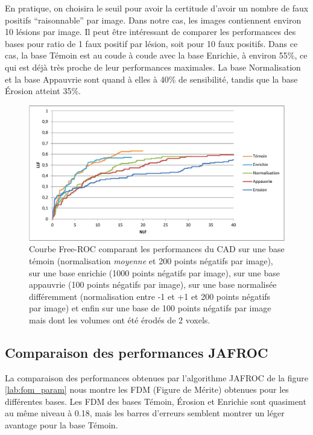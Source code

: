 En pratique, on choisira le seuil pour avoir la certitude d'avoir un nombre de faux positifs ``raisonnable'' par image. Dans notre cas, les images contiennent environ 10 lésions par image. Il peut être intéressant de comparer les performances des bases pour ratio de 1 faux positif par lésion, soit pour 10 faux positifs. Dans ce cas, la base Témoin est au coude à coude avec la base Enrichie, à environ 55\%, ce qui est déjà très proche de leur performances maximales. La base Normalisation et la base Appauvrie sont quand à elles à 40\% de sensibilité, tandis que la base Érosion atteint 35\%.


\begin{figure}[h!]
 
 \begin{center}
   \includegraphics[width=15cm]{images/FROC_param}
 \end{center}
 \caption{Courbe Free-ROC comparant les performances du CAD sur une base témoin (normalisation \emph{moyenne} et 200 points négatifs par image), sur une base enrichie (1000 points négatifs par image), sur une base appauvrie (100 points négatifs par image), sur une base normalisée différemment (normalisation entre -1 et +1 et 200 points négatifs par image) et enfin sur une base de 100 points négatifs par image mais dont les volumes ont été érodés de 2 voxels.}
 \label{lab:froc_comp_static}
\end{figure}


\subsection{Comparaison des performances JAFROC}

La comparaison des performances obtenues par l'algorithme JAFROC \cite{chakraborty1990free} de la figure \ref{lab:fom_param} nous montre les FDM (Figure de Mérite) obtenues pour les différentes bases. Les FDM des bases Témoin, Érosion et Enrichie sont quasiment au même niveau à 0.18, mais les barres d'erreurs semblent montrer un léger avantage pour la base Témoin.

